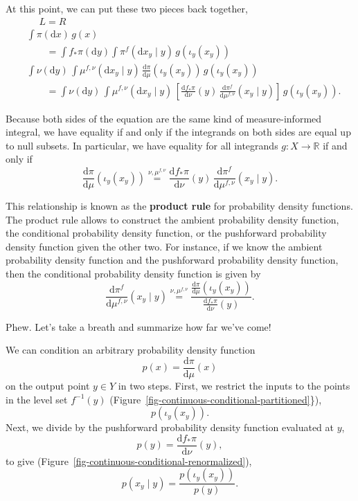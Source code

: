 \documentclass[
  letterpaper,
  DIV=11,
  numbers=noendperiod]{scrartcl}
\begin{document}
At this point, we can put these two pieces back together, \begin{align*}
&
\quad\; L = R
\\
&
\int \pi( \mathrm{d} x ) \, g(x)
\\
&\quad\quad=
\int f_{*} \pi (\mathrm{d} y)
\int \pi^{f}( \mathrm{d}x_{y} \mid y ) \, g( \iota_{y}(x_{y}) )
\\
&
\int \nu ( \mathrm{d} y ) \,
\int \mu^{f, \nu}( \mathrm{d} x_{y} \mid y) \,
\frac{ \mathrm{d} \pi}{ \mathrm{d} \mu }( \iota_{y}(x_{y}) ) \, g( \iota_{y}(x_{y}) )
\\
&\quad\quad=
\int \nu (\mathrm{d} y) \,
\int \mu^{f, \nu} ( \mathrm{d}x_{y} \mid y ) \,
\left[
  \frac{ \mathrm{d}  f_{*} \pi }{ \mathrm{d}  \nu  }(y) \,
  \frac{ \mathrm{d}  \pi^{f} }{ \mathrm{d}  \mu^{f, \nu}  }(x_{y} \mid y)
\right] \,
g( \iota_{y}(x_{y}) ).
\end{align*}

Because both sides of the equation are the same kind of measure-informed
integral, we have equality if and only if the integrands on both sides
are equal up to null subsets. In particular, we have equality for all
integrands \(g : X \rightarrow \mathbb{R}\) if and only if \[
\frac{ \mathrm{d} \pi}{ \mathrm{d} \mu }( \iota_{y}(x_{y}) )
\overset{ \nu, \mu^{f, \nu} }{ = }
\frac{ \mathrm{d}  f_{*} \pi }{ \mathrm{d}  \nu  }(y) \,
\frac{ \mathrm{d}  \pi^{f} }{ \mathrm{d}  \mu^{f, \nu}  }(x_{y} \mid y).
\]

This relationship is known as the \textbf{product rule} for probability
density functions. The product rule allows to construct the ambient
probability density function, the conditional probability density
function, or the pushforward probability density function given the
other two. For instance, if we know the ambient probability density
function and the pushforward probability density function, then the
conditional probability density function is given by \[
\frac{ \mathrm{d}  \pi^{f} }{ \mathrm{d}  \mu^{f, \nu}  } (x_{y} \mid y)
\overset{ \nu, \mu^{f, \nu} }{ = }
\frac{
  \frac{ \mathrm{d} \pi}{ \mathrm{d} \mu }( \iota_{y}(x_{y}) )
}{
  \frac{ \mathrm{d}  f_{*} \pi }{ \mathrm{d} \nu }(y)
}.
\]

Phew. Let's take a breath and summarize how far we've come!

We can condition an arbitrary probability density function \[
p(x) = \frac{ \mathrm{d} \pi}{ \mathrm{d} \mu }( x )
\] on the output point \(y \in Y\) in two steps. First, we restrict the
inputs to the points in the level set \(f^{-1}(y)\)
(Figure~\ref{fig-continuous-conditional-partitioned}\}), \[
p( \iota_{y}(x_{y}) ).
\] Next, we divide by the pushforward probability density function
evaluated at \(y\), \[
p(y) = \frac{ \mathrm{d}  f_{*} \pi }{ \mathrm{d} \nu }(y),
\] to give (Figure~\ref{fig-continuous-conditional-renormalized}), \[
p( x_{y} \mid y )
=
\frac{
  p( \iota_{y}(x_{y}) )
}{
  p(y)
}.
\]
\end{document}
